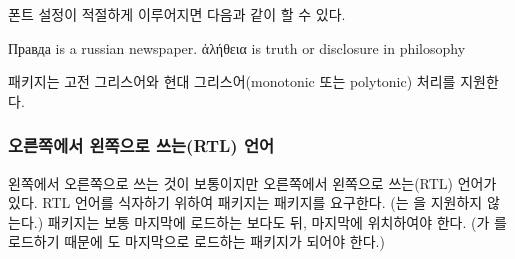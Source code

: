 폰트 설정이 적절하게 이루어지면 다음과 같이 할 수 있다.

{\setmonofont{cmuntt.otf}
\begin{example}
\textrussian{Правда} is
a russian newspaper.
\textgreek{ἀλήθεια} is truth
or disclosure in philosophy
\end{example}
}

 패키지\cite{xgreek}는 고전 그리스어와 현대 그리스어(monotonic 또는 polytonic)
처리를 지원한다.

\subsubsection{오른쪽에서 왼쪽으로 쓰는(RTL) 언어}

왼쪽에서 오른쪽으로 쓰는 것이 보통이지만 오른쪽에서 왼쪽으로 쓰는(RTL) 언어가 있다.
RTL 언어를 식자하기 위하여  패키지는  패키지를 요구한다. (는 을 지원하지 않는다.)
 패키지는 보통 마지막에 로드하는 보다도 뒤, 마지막에 위치하여야 한다. 
(가 를 로드하기 때문에 도 마지막으로 로드하는 패키지가 되어야 한다.)

